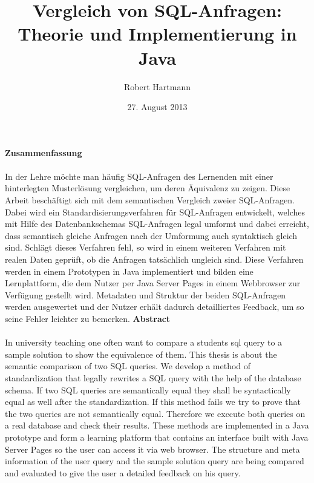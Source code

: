\documentclass[12pt]{scrreprt}
\author{Robert Hartmann}
\title{Vergleich von SQL-Anfragen: Theorie und Implementierung in Java}
\date{27. August 2013}
\theoremstyle{remark}
\begin{document}

%



\onehalfspacing
\vspace*{10mm}
{\huge \textbf{Zusammenfassung}}\\\\
In der Lehre möchte man häufig SQL-Anfragen des Lernenden mit einer hinterlegten Musterlösung vergleichen, um deren Äquivalenz zu zeigen. Diese Arbeit beschäftigt sich mit dem semantischen Vergleich zweier SQL-Anfragen. Dabei wird ein Standardisierungsverfahren für SQL-Anfragen entwickelt, welches mit Hilfe des Datenbankschemas SQL-Anfragen legal umformt und dabei erreicht, dass semantisch gleiche Anfragen nach der Umformung auch syntaktisch gleich sind. Schlägt dieses Verfahren fehl, so wird in einem weiteren Verfahren mit realen Daten geprüft, ob die Anfragen tatsächlich ungleich sind. Diese Verfahren werden in einem Prototypen in Java implementiert und bilden eine Lernplattform, die dem Nutzer per Java Server Pages in einem Webbrowser zur Verfügung gestellt wird. Metadaten und Struktur der beiden SQL-Anfragen werden ausgewertet und der Nutzer erhält dadurch detailliertes Feedback, um so seine Fehler leichter zu bemerken.\newline\newline\newline\newline\newline
{\huge \textbf{Abstract}}\\\\
In university teaching one often want to compare a students sql query to a sample solution to show the equivalence of them. This thesis is about the semantic comparison of two SQL queries. We develop a method of standardization that legally rewrites a SQL query with the help of the database schema. If two SQL queries are semantically equal they shall be syntactically equal as well after the standardization. If this method fails we try to prove that the two queries are not semantically equal. Therefore we execute both queries on a real database and check their results. These methods are implemented in a Java prototype and form a learning platform that contains an interface built with Java Server Pages so the user can access it via web browser. The structure and meta information of the user query and the sample solution query are being compared and evaluated to give the user a detailed feedback on his query.

\pagestyle{plain}
\end{document}
